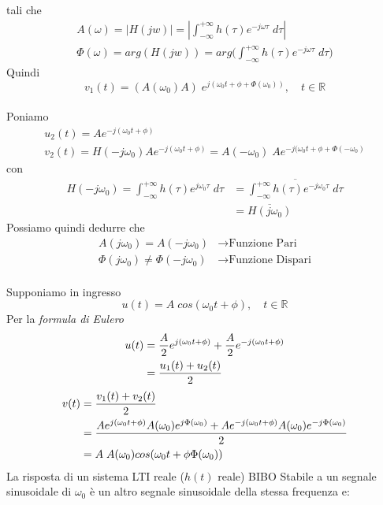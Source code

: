 \documentclass{article}
\begin{document}
			tali che
			\[
				\begin{gathered}
					A(\omega) = \left|H(jw)\right| = \left| \int_{-\infty}^{+\infty} {h(\tau)e^{-j\omega\tau}\; d\tau} \right| \\
					\Phi(\omega) = arg(H(jw)) = arg\Bigg(\int_{-\infty}^{+\infty} {h(\tau)e^{-j\omega\tau}\; d\tau}\Bigg)
				\end{gathered}
			\]
			Quindi
			\[
				v_1(t) = (A(\omega_0) A)\; e^{j(\omega_0t + \phi + \Phi(\omega_0))},\quad t \in \mathbb{R}
			\]
			\\
			Poniamo
			\[
				\begin{gathered}
					u_2(t) = Ae^{-j(\omega_0t + \phi)} \\
					v_2(t) = H(-j\omega_0)Ae^{-j(\omega_0t + \phi)} = A(-\omega_0)\; Ae^{-j(\omega_0t + \phi + \Phi(-\omega_0)}
				\end{gathered}
			\]
			con
			\[
				\begin{aligned}
					H(-j\omega_0) = \int_{-\infty}^{+\infty} {h(\tau)e^{j\omega_0\tau}\; d\tau} &= \overline{\int_{-\infty}^{+\infty} {h(\tau)e^{-j\omega_0\tau}\; d\tau}} \\
					&= \overline{H(j\omega_0)}
				\end{aligned}
			\]
			Possiamo quindi dedurre che
			\[
				\begin{aligned}
					A(j\omega_0) = A(-j\omega_0) &\rightarrow \text{Funzione Pari} \\
					\Phi(j\omega_0) \neq \Phi(-j\omega_0) &\rightarrow \text{Funzione Dispari}
				\end{aligned}
			\]
			\\
			Supponiamo in ingresso
			\[
				u(t) = A\; cos(\omega_0t + \phi),\quad t \in \mathbb{R}
			\]
			Per la \textit{formula di Eulero}
			\[
				\begin{aligned}
					u(t) &= {A\over{2}}e^{j(\omega_0t + \phi)} + {A\over{2}}e^{-j(\omega_0t + \phi)} \\
					&= {{u_1(t) + u_2(t)}\over{2}}
				\end{aligned}
			\]
			\[
				\begin{aligned}
					v(t) &= {{v_1(t) + v_2(t)}\over{2}} \\
					&= {{Ae^{j(\omega_0t + \phi)}A(\omega_0)e^{j\Phi(\omega_0)} + Ae^{-j(\omega_0t + \phi)}A(\omega_0)e^{-j\Phi(\omega_0)}}\over{2}} \\
					&= A\; A(\omega_0) cos(\omega_0t + \phi \Phi(\omega_0))
				\end{aligned}
			\]
			La risposta di un sistema LTI reale ($ h(t) $ reale) BIBO Stabile a un segnale sinusoidale di $ \omega_0 $ è un altro segnale sinusoidale della stessa frequenza e:
\end{document}
